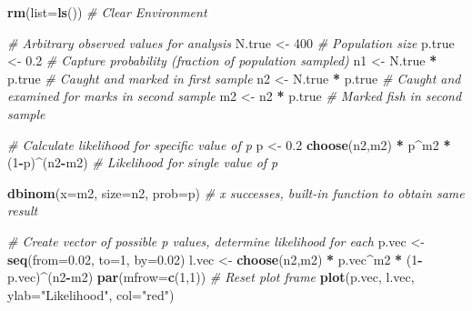 \documentclass[
]{krantz}
\makeatletter
\newenvironment{Shaded}{\begin{snugshade}}{\end{snugshade}}
\newcommand{\AttributeTok}[1]{\textcolor[rgb]{0.27,0.27,0.27}{#1}}
\newcommand{\CommentTok}[1]{\textcolor[rgb]{0.37,0.37,0.37}{\textit{#1}}}
\newcommand{\DecValTok}[1]{\textcolor[rgb]{0.06,0.06,0.06}{#1}}
\newcommand{\FloatTok}[1]{\textcolor[rgb]{0.06,0.06,0.06}{#1}}
\newcommand{\FunctionTok}[1]{\textcolor[rgb]{0.27,0.27,0.27}{\textbf{#1}}}
\newcommand{\NormalTok}[1]{#1}
\newcommand{\OtherTok}[1]{\textcolor[rgb]{0.37,0.37,0.37}{#1}}
\newcommand{\SpecialCharTok}[1]{\textcolor[rgb]{0.43,0.43,0.43}{\textbf{#1}}}
\newcommand{\StringTok}[1]{\textcolor[rgb]{0.5,0.5,0.5}{#1}}
\newenvironment{kframe}{%
\medskip{}
\setlength{\fboxsep}{.8em}
 \def\at@end@of@kframe{}%
 \ifinner\ifhmode%
  \def\at@end@of@kframe{\end{minipage}}%
  \begin{minipage}{\columnwidth}%
 \fi\fi%
 \def\FrameCommand##1{\hskip\@totalleftmargin \hskip-\fboxsep
 \colorbox{shadecolor}{##1}\hskip-\fboxsep
     \hskip-\linewidth \hskip-\@totalleftmargin \hskip\columnwidth}%
 \MakeFramed {\advance\hsize-\width
   \@totalleftmargin\z@ \linewidth\hsize
   \@setminipage}}%
 {\par\unskip\endMakeFramed%
 \at@end@of@kframe}
\renewenvironment{Shaded}{\begin{kframe}}{\end{kframe}}
\makeatother
\begin{document}
\begin{Shaded}
\begin{Highlighting}[]
\FunctionTok{rm}\NormalTok{(}\AttributeTok{list=}\FunctionTok{ls}\NormalTok{()) }\CommentTok{\# Clear Environment}

\CommentTok{\# Arbitrary \textquotesingle{}observed\textquotesingle{} values for analysis}
\NormalTok{N.true }\OtherTok{\textless{}{-}} \DecValTok{400}  \CommentTok{\# Population size}
\NormalTok{p.true }\OtherTok{\textless{}{-}} \FloatTok{0.2} \CommentTok{\# Capture probability (fraction of population sampled)}
\NormalTok{n1 }\OtherTok{\textless{}{-}}\NormalTok{ N.true }\SpecialCharTok{*}\NormalTok{ p.true }\CommentTok{\# Caught and marked in first sample}
\NormalTok{n2 }\OtherTok{\textless{}{-}}\NormalTok{ N.true }\SpecialCharTok{*}\NormalTok{ p.true }\CommentTok{\# Caught and examined for marks in second sample}
\NormalTok{m2 }\OtherTok{\textless{}{-}}\NormalTok{ n2 }\SpecialCharTok{*}\NormalTok{ p.true }\CommentTok{\# Marked fish in second sample}

\CommentTok{\# Calculate likelihood for specific value of p}
\NormalTok{p }\OtherTok{\textless{}{-}} \FloatTok{0.2}
\FunctionTok{choose}\NormalTok{(n2,m2) }\SpecialCharTok{*}\NormalTok{ p}\SpecialCharTok{\^{}}\NormalTok{m2 }\SpecialCharTok{*}\NormalTok{ (}\DecValTok{1}\SpecialCharTok{{-}}\NormalTok{p)}\SpecialCharTok{\^{}}\NormalTok{(n2}\SpecialCharTok{{-}}\NormalTok{m2) }\CommentTok{\# Likelihood for single value of p}

\FunctionTok{dbinom}\NormalTok{(}\AttributeTok{x=}\NormalTok{m2, }\AttributeTok{size=}\NormalTok{n2, }\AttributeTok{prob=}\NormalTok{p) }
\CommentTok{\# x successes, built{-}in function to obtain same result}

\CommentTok{\# Create vector of possible p values, determine likelihood for each}
\NormalTok{p.vec }\OtherTok{\textless{}{-}} \FunctionTok{seq}\NormalTok{(}\AttributeTok{from=}\FloatTok{0.02}\NormalTok{, }\AttributeTok{to=}\DecValTok{1}\NormalTok{, }\AttributeTok{by=}\FloatTok{0.02}\NormalTok{)}
\NormalTok{l.vec }\OtherTok{\textless{}{-}} \FunctionTok{choose}\NormalTok{(n2,m2) }\SpecialCharTok{*}\NormalTok{ p.vec}\SpecialCharTok{\^{}}\NormalTok{m2 }\SpecialCharTok{*}\NormalTok{ (}\DecValTok{1}\SpecialCharTok{{-}}\NormalTok{p.vec)}\SpecialCharTok{\^{}}\NormalTok{(n2}\SpecialCharTok{{-}}\NormalTok{m2)}
\FunctionTok{par}\NormalTok{(}\AttributeTok{mfrow=}\FunctionTok{c}\NormalTok{(}\DecValTok{1}\NormalTok{,}\DecValTok{1}\NormalTok{)) }\CommentTok{\# Reset plot frame}
\FunctionTok{plot}\NormalTok{(p.vec, l.vec, }\AttributeTok{ylab=}\StringTok{"Likelihood"}\NormalTok{, }\AttributeTok{col=}\StringTok{"red"}\NormalTok{)}


\end{Highlighting}
\end{Shaded}
\end{document}
